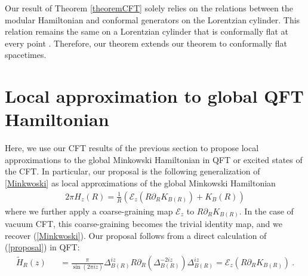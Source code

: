 \documentclass[a4paper,11pt]{article}
\theoremstyle{definition}
\newcommand{\nn}{\nonumber}
\newcommand{\lb}{\left(}
\newcommand{\rb}{\right)}
\newcommand{\p}{\partial}
\begin{document}
Our result of Theorem \ref{theoremCFT} solely relies on the relations between the modular Hamiltonian and conformal generators on the Lorentzian cylinder. This relation remains the same on a Lorentzian cylinder that is conformally flat at every point \cite{frob2023modular}. Therefore, our theorem extends our theorem to conformally flat spacetimes. 

\section{Local approximation to global QFT Hamiltonian}\label{sec:QFT}

Here, we use our CFT results of the previous section to propose local approximations to the global Minkowski Hamiltonian in QFT or excited states of the CFT. In particular, our proposal is the following generalization of \ref{Minkwoski} as local approximations of the global Minkowski Hamiltonian 
\begin{eqnarray}
    2\pi H_z(R)=\frac{1}{R}\lb \mathcal{E}_z(R\p_R K_{B(R)})+K_B(R)\rb
\end{eqnarray}
where we further apply a coarse-graining map $\mathcal{E}_z$ to $R\p_R K_{B(R)}$. In the case of vacuum CFT, this coarse-graining becomes the trivial identity map, and we recover (\ref{Minkwoski}). Our proposal follows from a direct calculation of (\ref{proposal}) in QFT:
\begin{eqnarray}
    \tilde{H}_R(z)&&=\frac{\pi}{\sin(2\pi i z)}\Delta_{B(R)}^{i z}R\p_R\lb \Delta_{B(R)}^{-2iz} \rb \Delta_{B(R)}^{iz}=\mathcal{E}_z(R\p_R K_{B(R)})\ .
\end{eqnarray}
\end{document}
